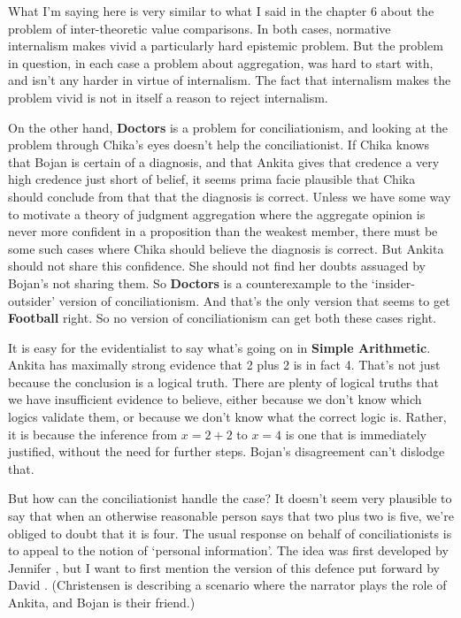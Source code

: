 What I'm saying here is very similar to what I said in the chapter 6 about the problem of inter-theoretic value comparisons. In both cases, normative internalism makes vivid a particularly hard epistemic problem. But the problem in question, in each case a problem about aggregation, was hard to start with, and isn't any harder in virtue of internalism. The fact that internalism makes the problem vivid is not in itself a reason to reject internalism.

On the other hand, \textbf{Doctors} is a problem for conciliationism, and looking at the problem through \gls{Chika}'s eyes doesn't help the conciliationist. If \gls{Chika} knows that \gls{Bojan} is certain of a diagnosis, and that \gls{Ankita} gives that credence a very high credence just short of belief, it seems prima facie plausible that \gls{Chika} should conclude from that that the diagnosis is correct. Unless we have some way to motivate a theory of judgment aggregation where the aggregate opinion is never more confident in a proposition than the weakest member, there must be some such cases where \gls{Chika} should believe the diagnosis is correct. But \gls{Ankita} should not share this confidence. She should not find her doubts assuaged by \gls{Bojan}'s not sharing them. So \textbf{Doctors} is a counterexample to the `insider-outsider' version of conciliationism. And that's the only version that seems to get \textbf{Football} right. So no version of conciliationism can get both these cases right.

It is easy for the evidentialist to say what's going on in \textbf{Simple Arithmetic}. \gls{Ankita} has maximally strong evidence that 2 plus 2 is in fact 4. That's not just because the conclusion is a logical truth. There are plenty of logical truths that we have insufficient evidence to believe, either because we don't know which logics validate them, or because we don't know what the correct logic is. Rather, it is because the inference from $x = 2 + 2$ to $x = 4$ is one that is immediately justified, without the need for further steps. \gls{Bojan}'s disagreement can't dislodge that.

But how can the conciliationist handle the case? It doesn't seem very plausible to say that when an otherwise reasonable person says that two plus two is five, we're obliged to doubt that it is four. The usual response on behalf of conciliationists is to appeal to the notion of `personal information'. The idea was first developed by Jennifer \citet{Lackey2010}, but I want to first mention the version of this defence put forward by David \citet{Christensen2011}. (Christensen is describing a scenario where the narrator plays the role of Ankita, and Bojan is their friend.)

